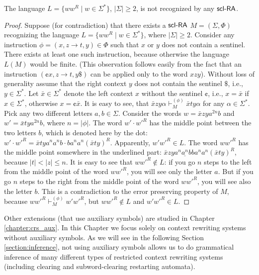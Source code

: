 \begin{theorem}[\cite{C13}]
The language $L = \{ w w^R \mid w \in \Sigma^* \}$, $|\Sigma| \ge 2$, is not recognized by any $\mbox{\sf scl-RA}$.
\end{theorem}

\begin{proof}
Suppose (for contradiction) that there exists a $\mbox{\sf scl-RA}$ $M = (\Sigma, \Phi)$  recognizing the language $L = \{ w w^R \mid w \in \Sigma^* \}$, where $|\Sigma| \ge 2$. Consider any instruction $\phi = (x, z \to t, y) \in \Phi$ such that $x$ or $y$ does not contain a sentinel. There exists at least one such instruction, because otherwise the language $L(M)$ would be finite. (This observation follows easily from the fact that an instruction  $(\cent x, z \to t, y\$)$ can be applied only to the word $xzy$). Without loss of generality assume that the right context $y$ does not contain the sentinel $\$$, i.e., $y \in \Sigma^*$. Let $\bar{x} \in \Sigma^*$ denote the left context $x$ without the sentinel $\cent$, i.e., $x = \bar{x}$ if $x \in \Sigma^*$, otherwise $x = \cent \bar{x}$. It is easy to see, that $\bar{x} z y \alpha \vdash_M^{(\phi)} \bar{x} t y \alpha$ for any $\alpha \in \Sigma^*$. Pick any two different letters $a, b \in \Sigma$. Consider the words $w = \bar{x} z y a^{2n} b$ and $w' = \bar{x} t y a^{2n} b$, where $n = |\phi|$. The word $w' \cdot w'^R$ has the middle point between the two letters $b$, which is denoted here by the dot: $w' \cdot w'^R = \bar{x} t y a^n a^n b \cdot b a^n a^n (\bar{x} t y)^R$. Apparently, $w' w'^R \in L$. The word $w w'^R$ has the middle point somewhere in the underlined part: $\bar{x} z y a^n \underline{a^n} b b a^n a^n (\bar{x} t y)^R$, because $|t| < |z| \le n$. It is easy to see that $w w'^R \notin L$: if you go $n$ steps to the left from the middle point of the word $w w'^R$, you will see only the letter $a$. But if you go $n$ steps to the right from the middle point of the word $w w'^R$, you will see also the letter $b$. This is a contradiction to the error preserving property of $M$, because $w w'^R \vdash_M^{(\phi)} w' w'^R$, but $w w'^R \notin L$ and $w' w'^R \in L$.
\end{proof}

Other extensions (that use auxiliary symbols) are studied in Chapter \ref{chapter:crs_aux}. In this Chapter we focus solely on context rewriting systems without auxiliary symbols. As we will see in the following Section \ref{section:inference}, not using auxiliary symbols allows us to do grammatical inference of many different types of restricted context rewriting systems (including clearing and subword-clearing restarting automata).

